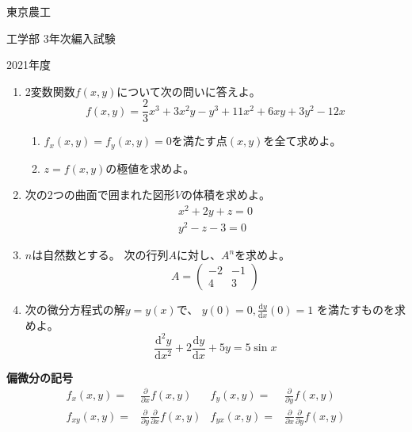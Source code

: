 \documentclass[12pt,b5paper]{ltjsarticle}
\begin{document}
東京農工

工学部
3年次編入試験

\hrulefill
2021年度
\hrulefill

\begin{enumerate}
 \item 2変数関数$f(x,y)$について次の問いに答えよ。
       \begin{equation}
        f(x,y) = \frac{2}{3}x^3 + 3x^2y - y^3 + 11x^2 +6xy + 3y^2 - 12x
       \end{equation}
       \begin{enumerate}
        \item $f_x(x,y) = f_y(x,y) = 0$を満たす点$(x,y)$を全て求めよ。
              \label{135442_20May22}
        \item $z=f(x,y)$の極値を求めよ。
              \label{110917_21May22}
       \end{enumerate}
 \item 次の2つの曲面で囲まれた図形$V$の体積を求めよ。
       \begin{gather}
        x^2+2y+z=0\\
        y^2-z-3=0
       \end{gather}
 \item $n$は自然数とする。
       次の行列$A$に対し、$A^n$を求めよ。
       \begin{equation}
        A=\begin{pmatrix} -2 & -1 \\ 4 & 3 \end{pmatrix}
       \end{equation}
 \item 次の微分方程式の解$y=y(x)$で、
       $y(0)=0, \frac{\mathrm{d}y}{\mathrm{d}x}(0)=1$
       を満たすものを求めよ。
       \begin{equation}
        \frac{\mathrm{d}^2y}{\mathrm{d}x^2}
         +2 \frac{\mathrm{d}y}{\mathrm{d}x}
         + 5y =5\sin{x}
       \end{equation}
\end{enumerate}

\dotfill

\textbf{偏微分の記号}
\begin{align}
 f_x(x,y) =& \frac{\partial}{\partial x}f(x,y)
  & f_y(x,y) =& \frac{\partial}{\partial y}f(x,y)\\
 f_{xy}(x,y) =& \frac{\partial}{\partial y}\frac{\partial}{\partial x}f(x,y)
  & f_{yx}(x,y) =& \frac{\partial}{\partial x}\frac{\partial}{\partial y}f(x,y)
\end{align}
\end{document}
